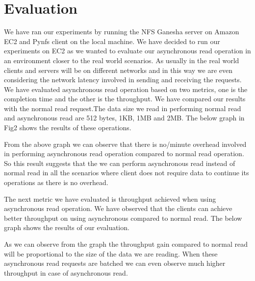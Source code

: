 \section{Evaluation}

	We have ran our experiments by running the NFS Ganesha server on Amazon EC2 and Pynfs client on the local machine. We have decided to run our experiments on EC2 as we wanted to evaluate our asynchronous read operation in an environment closer to the real world scenarios. As usually in the real world clients and servers will be on different networks and in this way we are even considering the network latency involved in sending and receiving the requests. We have evaluated asynchronous read operation based on two metrics, one is the completion time and the other is the throughput. We have compared our results with the normal read request.The data size we read in performing normal read and asynchronous read are 512 bytes, 1KB, 1MB and 2MB. The below graph in Fig2 shows the results of these operations.
	

	From the above graph we can observe that there is no/minute overhead involved in performing asynchronous read operation compared to normal read operation. So this result suggests that the  we can perform asynchronous read instead of normal read in all the scenarios where client does not  require data to continue its operations as there is no overhead. 

	The next metric we have evaluated is throughput achieved when using asynchronous read operation. We have observed that the clients can achieve better throughput on using asynchronous compared to normal read. The below graph shows the results of our evaluation.


	As we can observe from the graph the throughput gain compared to normal read will be proportional to the size of the data we are reading. When these asynchronous read requests are batched we can even observe much higher throughput in case of asynchronous read.  

